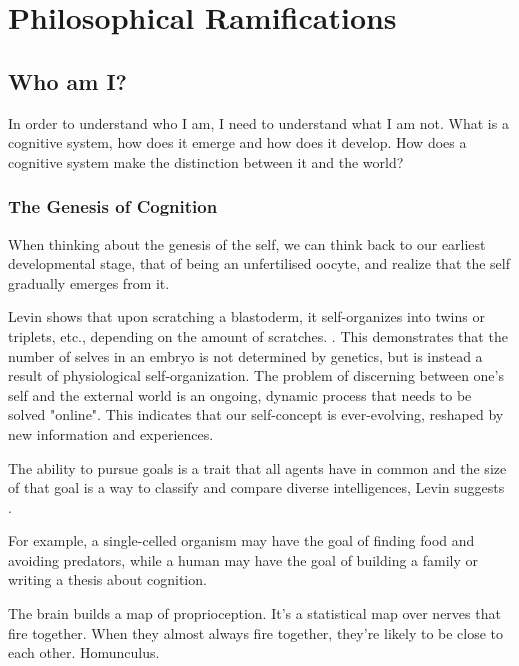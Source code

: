 \chapter{Philosophical Ramifications}





\section{Who am I?}
In order to understand who I am, I need to understand what I am not.
What is a cognitive system, how does it emerge and how does it develop.
How does a cognitive system make the distinction between it and the world?

\subsection{The Genesis of Cognition}

When thinking about the genesis of the self, we can think back to our earliest developmental stage, that of being an unfertilised \gls{oocyte}, and realize that the self gradually emerges from it.

Levin shows that upon scratching a \gls{blastoderm}, it self-organizes into twins or triplets, etc., depending on the amount of scratches. . This demonstrates that the number of selves in an \gls{embryo} is not determined by genetics, but is instead a result of physiological self-organization. The problem of discerning between one's self and the external world is an ongoing, dynamic process that needs to be solved "online". This indicates that our self-concept is ever-evolving, reshaped by new information and experiences.

The ability to pursue goals is a trait that all agents have in common and the size of that goal is a way to classify and compare diverse intelligences, Levin suggests \cite{Levin_2022, levin_computational_2019}.

For example, a single-celled organism may have the goal of finding food and avoiding predators, while a human may have the goal of building a family or writing a thesis about cognition.

The brain builds a map of proprioception. It's a statistical map over nerves that fire together. When they almost always fire together, they're likely to be close to each other. Homunculus.

